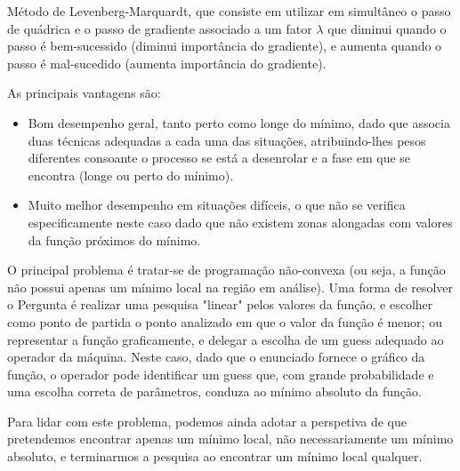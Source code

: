 \documentclass{mnum}
\begin{document}
Método de Levenberg-Marquardt, que consiste em utilizar em simultâneo o passo de quádrica e o passo de gradiente associado a um fator $\lambda$ que diminui quando o passo é bem-sucessido (diminui importância do gradiente), e aumenta quando o passo é mal-sucedido (aumenta importância do gradiente).

As principais vantagens são:
\begin{itemize}
    \item Bom desempenho geral, tanto perto como longe do mínimo, dado que associa duas técnicas adequadas a cada uma das situações, atribuindo-lhes pesos diferentes consoante o processo se está a desenrolar e a fase em que se encontra (longe ou perto do mínimo).
    \item Muito melhor desempenho em situações difíceis, o que não se verifica especificamente neste caso dado que não existem zonas alongadas com valores da função próximos do mínimo.
\end{itemize}

O principal problema é tratar-se de programação não-convexa (ou seja, a função não possui apenas um mínimo local na região em análise). Uma forma de resolver o Pergunta é realizar uma pesquisa "linear" pelos valores da função, e escolher como ponto de partida o ponto analizado em que o valor da função é menor; ou representar a função graficamente, e delegar a escolha de um guess adequado ao operador da máquina. Neste caso, dado que o enunciado fornece o gráfico da função, o operador pode identificar um guess que, com grande probabilidade e uma escolha correta de parâmetros, conduza ao mínimo absoluto da função.\par
Para lidar com este problema, podemos ainda adotar a perspetiva de que pretendemos encontrar apenas um mínimo local, não necessariamente um mínimo absoluto, e terminarmos a pesquisa ao encontrar um mínimo local qualquer.

\newpage
\end{document}
